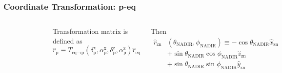 \documentclass{beamer}
\begin{document}
\begin{frame}\frametitle{Coordinate Transformation: p-eq}
  \begin{columns}
    \begin{figure}[h!]
      \centering
      \includegraphics[width=0.9\textwidth]{figure/fig_coordinate/coord_eq_p_v3.pdf}
    \end{figure}

      Transformation matrix is defined as
      \begin{equation*}
        \hat{r}_\text{p} \equiv T_{\text{eq}\rightarrow\text{p}} (\delta^\text{x}_\text{p}, \alpha^\text{x}_\text{p}, \delta^\text{z}_\text{p}, \alpha^\text{z}_\text{p}) \hat{r}_\text{eq}
        \label{eq:rep_tf_eq_p}
      \end{equation*}

      Then 
      \begin{equation*}
      \begin{split}
        \hat{r}_\text{zn} & (\theta_\text{NADIR}, \phi_\text{NADIR}) \equiv -\cos\theta_\text{NADIR}\hat{x}_\text{zn}\\
        & + \sin\theta_\text{NADIR}\cos\phi_\text{NADIR}\hat{z}_\text{zn}\\
        & + \sin\theta_\text{NADIR}\sin\phi_\text{NADIR}\hat{y}_\text{zn}
      \end{split}
      \end{equation*}


\end{columns}
\end{frame}
\end{document}
